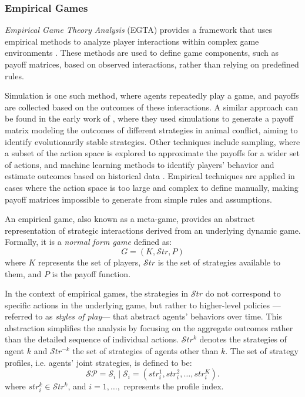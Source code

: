     \subsubsection{Empirical Games}

        \emph{Empirical Game Theory Analysis} (EGTA) provides a framework that uses empirical methods to analyze player interactions within complex game environments \cite{Levet2016GameT}. These methods are used to define game components, such as payoff matrices, based on observed interactions, rather than relying on predefined rules.\tinydouble 
        
        \noindent
        Simulation is one such method, where agents repeatedly play a game, and payoffs are collected based on the outcomes of these interactions. A similar approach can be found in the early work of \cite{SMITH1973}, where they used simulations to generate a payoff matrix modeling the outcomes of different strategies in animal conflict, aiming to identify evolutionarily stable strategies. Other techniques include sampling, where a subset of the action space is explored to approximate the payoffs for a wider set of actions, and machine learning methods to identify players' behavior and estimate outcomes based on historical data \cite{wellman2024empiricalgametheoreticanalysissurvey}. Empirical techniques are applied in cases where the action space is too large and complex to define manually, making payoff matrices impossible to generate from simple rules and assumptions.\tinydouble

        \noindent
        An empirical game, also known as a meta-game, provides an abstract representation of strategic interactions derived from an underlying dynamic game. Formally, it is a \emph{normal form game} defined as:
        \begin{equation}
            G = (K, \mathcal{S}tr, P)
            \label{eq:nfg}
        \end{equation}        
        where $K$ represents the set of players, $\mathcal{S}tr$ is the set of strategies available to them, and $P$ is the payoff function.\tinydouble
        
        \noindent
        In the context of empirical games, the strategies in $\mathcal{S}tr$ do not correspond to specific actions in the underlying game, but rather to higher-level policies —referred to as \emph{styles of play}— that abstract agents' behaviors over time. This abstraction simplifies the analysis by focusing on the aggregate outcomes rather than the detailed sequence of individual actions. $\mathcal{S}tr^k$ denotes the strategies of agent $k$ and $\mathcal{S}tr^{-k}$ the set of strategies of agents other than $k$. The set of strategy profiles, i.e. agents' joint strategies, is defined to be:
        \begin{equation}
            \mathcal{SP} = \mathcal{S}_i \mid \mathcal{S}_i = (str_i^1, str_i^2, \dots, str_i^K).
            \label{eq:strategy_profiles}
        \end{equation}
        where $str_i^k \in \mathcal{S}tr^k$, and $i = 1, \dots,$ represents the profile index.\tinydouble
        

